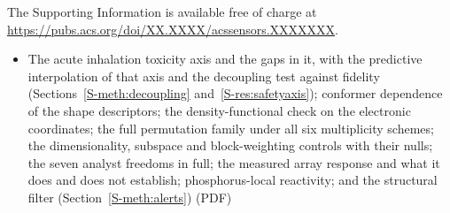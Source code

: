 \documentclass[journal=jacsat,manuscript=article,margin=1in]{achemso}
\begin{document}
\begin{suppinfo}
The Supporting Information is available free of charge at
\url{https://pubs.acs.org/doi/XX.XXXX/acssensors.XXXXXXX}.
\begin{itemize}
\item The acute inhalation toxicity axis and the gaps in it, with the
  predictive interpolation of that axis and the decoupling test against
  fidelity (Sections~\ref{S-meth:decoupling} and~\ref{S-res:safetyaxis});
  conformer dependence of the shape descriptors; the
  density-functional check on the electronic coordinates; the full permutation
  family under all six multiplicity schemes; the dimensionality, subspace and
  block-weighting controls with their nulls; the seven analyst freedoms in full;
  the measured array response and what it does and does not establish;
  phosphorus-local reactivity; and the structural filter
  (Section~\ref{S-meth:alerts}) (PDF)
\end{itemize}
\end{suppinfo}


\end{document}
